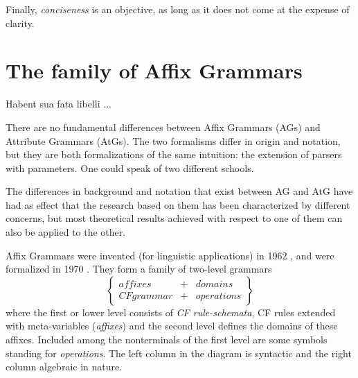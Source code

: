 Finally, {\em conciseness} is an objective, as long as it does not come
at the expense of clarity.

\section{The family of Affix Grammars}
\begin{flushright}
Habent sua fata libelli ...
\end{flushright}

There are no fundamental differences between Affix Grammars (AGs) and
Attribute Grammars (AtGs).
The two formalisms differ in origin and notation, but
they are both formalizations of the same intuition: the extension of
parsers with parameters. One could speak of two different schools.

The differences in background and notation that exist
between AG and AtG have had as effect that the research based on them
has been characterized by different concerns, but most theoretical results
achieved with respect to one of them can also be applied to the other.

Affix Grammars were invented (for linguistic applications) in 1962
\cite{meertens:first}, and were formalized in 1970 \cite{koster:afg}.
They form a family of two-level grammars
\[ \left\{ \begin{array}{rcl}
          affixes &+& domains\\CF grammar &+& operations
          \end{array} \right\} \]
\noindent
where
the first or lower level consists of {\em CF rule-schemata}, CF rules
extended with meta-variables ({\em affixes}) and the second level
defines the domains of these affixes. Included among the nonterminals
of the first level are some symbols standing for {\em operations}.
The left column in the diagram is syntactic and the right column algebraic
in nature.

